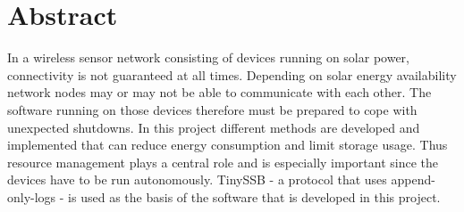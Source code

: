 \chapter{Abstract}

In a wireless sensor network consisting of devices running on solar power, connectivity is not guaranteed at all times. Depending on solar energy availability network nodes may or may not be able to communicate with each other. The software running on those devices therefore must be prepared to cope with unexpected shutdowns. In this project different methods are developed and implemented that can reduce energy consumption and limit storage usage. Thus resource management plays a central role and is especially important since the devices have to be run autonomously. TinySSB - a protocol that uses append-only-logs - is used as the basis of the software that is developed in this project.